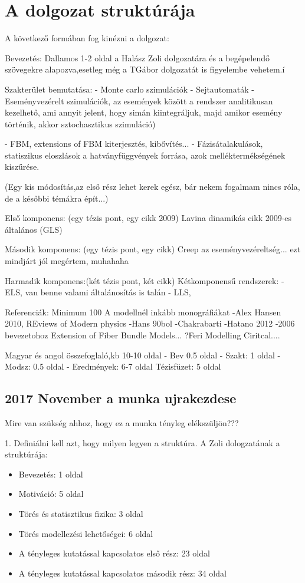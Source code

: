 \chapter{A dolgozat struktúrája}

A következő formában fog kinézni a dolgozat:

Bevezetés:
Dallamos 1-2 oldal a Halász Zoli dolgozatára és a begépelendő szövegekre alapozva,esetleg még a TGábor dolgozatát is figyelembe vehetem.í


Szakterület bemutatása:
- Monte carlo szimulációk
- Sejtautomaták
- Eseményvezérelt szimulációk, az események között a rendszer analitikusan kezelhető, ami annyit jelent, hogy simán kiintegráljuk, majd amikor esemény történik, akkor sztochasztikus szimuláció)

- FBM, extensions of FBM kiterjesztés, kibővítés...
- Fázisátalakulások, statiszikus eloszlások a hatványfüggvények forrása, azok melléktermékségének kiszűrése.


(Egy kis módosítás,az első rész lehet kerek egész, bár nekem fogalmam nincs róla, de a későbbi témákra épít...)

Első komponens: (egy tézis pont, egy cikk 2009)
Lavina dinamikás cikk 2009-es általános (GLS)

Második komponens: (egy tézis pont, egy cikk)
Creep az eseményvezéreltség... ezt mindjárt jól megértem, muhahaha

Harmadik komponens:(két tézis pont, két cikk)
Kétkomponensű rendszerek:
- ELS, van benne valami általánosítás is talán
- LLS,


Referenciák:
Minimum 100
A modellnél inkább monográfiákat
-Alex Hansen 2010, REviews of Modern physics
-Hans 90bol
-Chakrabarti
-Hatano 2012
-2006 bevezetohoz Extension of Fiber Bundle Models... ?Feri Modelling Ciritcal....

Magyar és angol összefoglaló,kb 10-10 oldal
- Bev 0.5 oldal
- Szakt: 1 oldal
- Modsz: 0.5 oldal
- Eredmények: 6-7 oldal
Tézisfüzet: 5 oldal


\section{2017 November a munka ujrakezdese}

Mire van szükség ahhoz, hogy ez a munka tényleg elékszüljön???

1. Definiálni kell azt, hogy milyen legyen a struktúra.
A Zoli dologzatának a struktúrája:
\begin{itemize}
  \item Bevezetés: 1 oldal
  \item Motiváció: 5 oldal
  \item Törés és statisztikus fizika: 3 oldal
  \item Törés modellezési lehetőségei: 6 oldal
  \item A tényleges kutatással kapcsolatos első rész: 23 oldal
  \item A tényleges kutatással kapcsolatos második rész: 34 oldal
\end{itemize}







